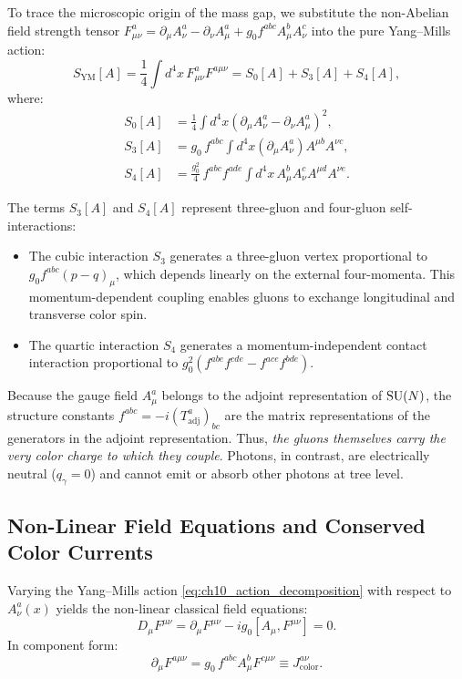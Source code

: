 To trace the microscopic origin of the mass gap, we substitute the non-Abelian field strength tensor $F_{\mu\nu}^a = \partial_\mu A_\nu^a - \partial_\nu A_\mu^a + g_0 f^{abc} A_\mu^b A_\nu^c$ into the pure Yang--Mills action:
\begin{equation}
\label{eq:ch10_action_decomposition}
S_{\mathrm{YM}}[A] = \frac{1}{4} \int d^4x \, F_{\mu\nu}^a F^{a\mu\nu} = S_0[A] + S_3[A] + S_4[A],
\end{equation}
where:
\begin{align}
\label{eq:ch10_action_pieces}
S_0[A] &= \frac{1}{4} \int d^4x \left( \partial_\mu A_\nu^a - \partial_\nu A_\mu^a \right)^2, \\
S_3[A] &= g_0 \, f^{abc} \int d^4x \left( \partial_\mu A_\nu^a \right) A^{\mu b} A^{\nu c}, \\
S_4[A] &= \frac{g_0^2}{4} \, f^{abc} f^{ade} \int d^4x \, A_\mu^b A_\nu^c A^{\mu d} A^{\nu e}.
\end{align}

The terms $S_3[A]$ and $S_4[A]$ represent three-gluon and four-gluon self-interactions:
\begin{itemize}
    \item The cubic interaction $S_3$ generates a three-gluon vertex proportional to $g_0 f^{abc} (p - q)_\mu$, which depends linearly on the external four-momenta. This momentum-dependent coupling enables gluons to exchange longitudinal and transverse color spin.
    \item The quartic interaction $S_4$ generates a momentum-independent contact interaction proportional to $g_0^2 (f^{abe} f^{cde} - f^{ace} f^{bde})$.
\end{itemize}

Because the gauge field $A_\mu^a$ belongs to the adjoint representation of $\mathrm{SU}(N)$, the structure constants $f^{abc} = -i (T_{\mathrm{adj}}^a)_{bc}$ are the matrix representations of the generators in the adjoint representation. Thus, \emph{the gluons themselves carry the very color charge to which they couple}. Photons, in contrast, are electrically neutral ($q_\gamma = 0$) and cannot emit or absorb other photons at tree level.

\subsection{Non-Linear Field Equations and Conserved Color Currents}
\label{subsec:nonlinear_field_equations}

Varying the Yang--Mills action \eqref{eq:ch10_action_decomposition} with respect to $A_\nu^a(x)$ yields the non-linear classical field equations:
\begin{equation}
\label{eq:ch10_yang_mills_eom}
D_\mu F^{\mu\nu} = \partial_\mu F^{\mu\nu} - i g_0 [A_\mu, F^{\mu\nu}] = 0.
\end{equation}
In component form:
\begin{equation}
\label{eq:ch10_component_eom}
\partial_\mu F^{a\mu\nu} = g_0 \, f^{abc} A_\mu^b F^{c\mu\nu} \equiv J_{\mathrm{color}}^{a\nu}.
\end{equation}

